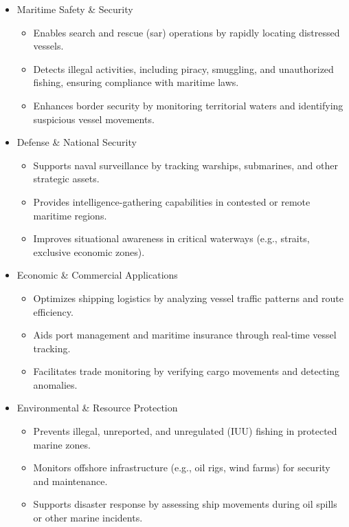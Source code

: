 \documentclass{article}
\begin{document}
\begin{itemize}
    \item Maritime Safety \& Security
    \begin{itemize}
        \item Enables search and rescue (\acrshort{sar}) operations by rapidly locating distressed vessels. \item Detects illegal activities, including piracy, smuggling, and unauthorized fishing, ensuring compliance with maritime laws. \item Enhances border security by monitoring territorial waters and identifying suspicious vessel movements. \end{itemize}
    \item Defense \& National Security
    \begin{itemize}
        \item Supports naval surveillance by tracking warships, submarines, and other strategic assets. \item Provides intelligence-gathering capabilities in contested or remote maritime regions. \item Improves situational awareness in critical waterways (e.g., straits, exclusive economic zones). \end{itemize}
    \item Economic \& Commercial Applications
    \begin{itemize}
        \item Optimizes shipping logistics by analyzing vessel traffic patterns and route efficiency. \item Aids port management and maritime insurance through real-time vessel tracking. \item Facilitates trade monitoring by verifying cargo movements and detecting anomalies. \end{itemize}
    \item Environmental \& Resource Protection
    \begin{itemize}
        \item Prevents illegal, unreported, and unregulated (IUU) fishing in protected marine zones. \item Monitors offshore infrastructure (e.g., oil rigs, wind farms) for security and maintenance. \item Supports disaster response by assessing ship movements during oil spills or other marine incidents. \end{itemize}
\end{itemize}
\end{document}
